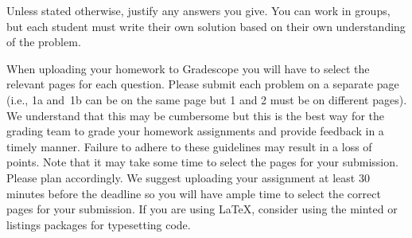 Unless stated otherwise, justify any answers you give.
You can work in groups, but each
student must write their own solution based on their own
understanding of the problem.

When uploading your homework to Gradescope you will have to
select the relevant pages for each question.  Please submit each
problem on a separate page (i.e., 1a and~1b can be on the same page but 1
and 2 must be on different pages).  We understand that this may be
cumbersome but this is the best way for the grading team to grade your
homework assignments and provide feedback in a timely manner.  Failure
to adhere to these guidelines may result in a loss of points.
Note that it may take some time to
select the pages for your submission.  Please plan accordingly.  We
suggest uploading your assignment at least 30 minutes before the deadline
so you will have ample time to select the correct pages for your
submission.  If you are using \LaTeX, consider using the minted or
listings packages for typesetting code.  
